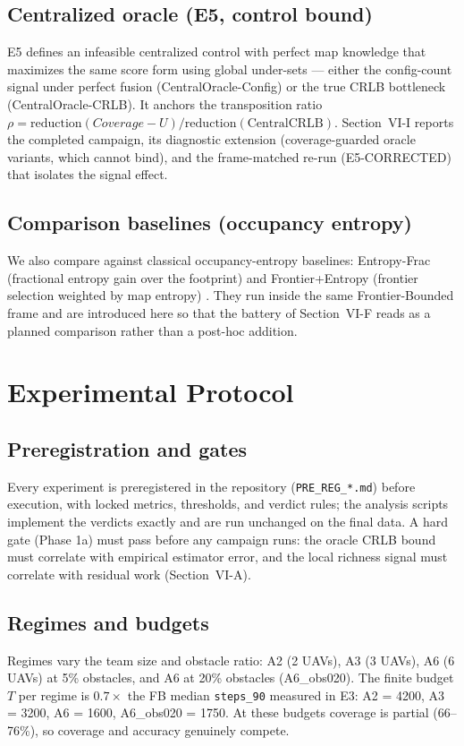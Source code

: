 \documentclass[journal]{IEEEtran}
\newcommand{\CU}{Coverage-U}
\begin{document}
\subsection{Centralized oracle (E5, control bound)}
E5 defines an infeasible centralized control with perfect map knowledge that
maximizes the same score form using global under-sets --- either the
config-count signal under perfect fusion (CentralOracle-Config) or the true
CRLB bottleneck (CentralOracle-CRLB). It anchors the transposition ratio
$\rho = \mathrm{reduction}(\CU) / \mathrm{reduction}(\text{CentralCRLB})$.
Section~VI-I reports the completed campaign, its diagnostic extension
(coverage-guarded oracle variants, which cannot bind), and the frame-matched
re-run (E5-CORRECTED) that isolates the signal effect.

\subsection{Comparison baselines (occupancy entropy)}
We also compare against classical occupancy-entropy baselines: Entropy-Frac
(fractional entropy gain over the footprint) and Frontier+Entropy (frontier
selection weighted by map entropy) \cite{Bourgault2002, Stachniss2005}. They
run inside the same Frontier-Bounded frame and are introduced here so that the
battery of Section~VI-F reads as a planned comparison rather than a post-hoc
addition.


\section{Experimental Protocol}
\subsection{Preregistration and gates}
Every experiment is preregistered in the repository (\texttt{PRE\_REG\_*.md})
before execution, with locked metrics, thresholds, and verdict rules; the
analysis scripts implement the verdicts exactly and are run unchanged on the
final data. A hard gate (Phase 1a) must pass before any campaign runs: the
oracle CRLB bound must correlate with empirical estimator error, and the local
richness signal must correlate with residual work (Section~VI-A).

\subsection{Regimes and budgets}
Regimes vary the team size and obstacle ratio: A2 (2 UAVs), A3 (3 UAVs), A6
(6 UAVs) at 5\% obstacles, and A6 at 20\% obstacles (A6\_obs020). The finite
budget $T$ per regime is $0.7 \times$ the FB median \texttt{steps\_90}
measured in E3: A2 = 4200, A3 = 3200, A6 = 1600, A6\_obs020 = 1750. At these
budgets coverage is partial (66--76\%), so coverage and accuracy genuinely
compete.
\end{document}
